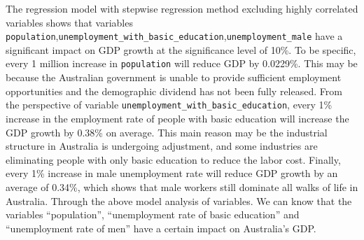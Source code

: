 \documentclass[11pt,a4paper,]{article}
\begin{document}
The regression model with stepwise regression method excluding highly correlated variables shows that variables \texttt{population},\texttt{unemployment\_with\_basic\_education},\texttt{unemployment\_male} have a significant impact on GDP growth at the significance level of 10\%. To be specific, every 1 million increase in \texttt{population} will reduce GDP by 0.0229\%. This may be because the Australian government is unable to provide sufficient employment opportunities and the demographic dividend has not been fully released. From the perspective of variable \texttt{unemployment\_with\_basic\_education}, every 1\% increase in the employment rate of people with basic education will increase the GDP growth by 0.38\% on average. This main reason may be the industrial structure in Australia is undergoing adjustment, and some industries are eliminating people with only basic education to reduce the labor cost. Finally, every 1\% increase in male unemployment rate will reduce GDP growth by an average of 0.34\%, which shows that male workers still dominate all walks of life in Australia.
Through the above model analysis of variables. We can know that the variables ``population'', ``unemployment rate of basic education'' and ``unemployment rate of men'' have a certain impact on Australia's GDP.

\printbibliography
\end{document}
